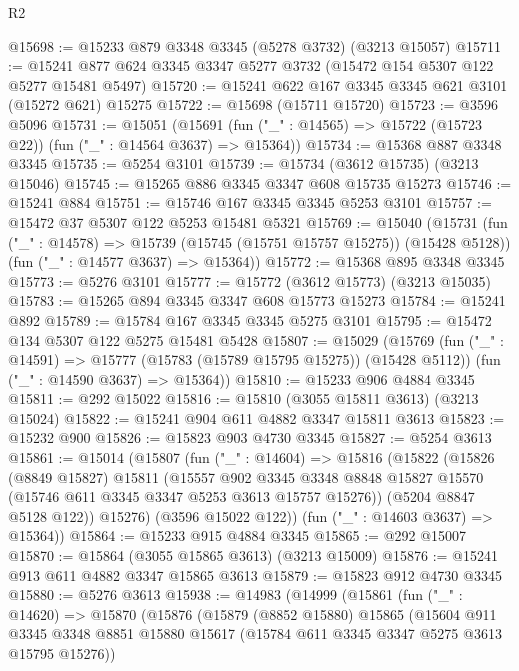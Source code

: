 \begin{lexlean}{R2}
\begin{coremodule}
@15698 := @15233 @879 @3348 @3345 (@5278 @3732) (@3213 @15057)
@15711 := @15241 @877 @624 @3345 @3347 @5277 @3732 (@15472 @154 @5307 @122 @5277 @15481 @5497)
@15720 := @15241 @622 @167 @3345 @3345 @621 @3101 (@15272 @621) @15275
@15722 := @15698 (@15711 @15720)
@15723 := @3596 @5096
@15731 := @15051
    (@15691 (fun ("_" : @14565) => @15722 (@15723 @22)) (fun ("_" : @14564 @3637) => @15364))
@15734 := @15368 @887 @3348 @3345
@15735 := @5254 @3101
@15739 := @15734 (@3612 @15735) (@3213 @15046)
@15745 := @15265 @886 @3345 @3347 @608 @15735 @15273
@15746 := @15241 @884
@15751 := @15746 @167 @3345 @3345 @5253 @3101
@15757 := @15472 @37 @5307 @122 @5253 @15481 @5321
@15769 := @15040
    (@15731
      (fun ("_" : @14578) => @15739 (@15745 (@15751 @15757 @15275)) (@15428 @5128))
      (fun ("_" : @14577 @3637) => @15364))
@15772 := @15368 @895 @3348 @3345
@15773 := @5276 @3101
@15777 := @15772 (@3612 @15773) (@3213 @15035)
@15783 := @15265 @894 @3345 @3347 @608 @15773 @15273
@15784 := @15241 @892
@15789 := @15784 @167 @3345 @3345 @5275 @3101
@15795 := @15472 @134 @5307 @122 @5275 @15481 @5428
@15807 := @15029
    (@15769
      (fun ("_" : @14591) => @15777 (@15783 (@15789 @15795 @15275)) (@15428 @5112))
      (fun ("_" : @14590 @3637) => @15364))
@15810 := @15233 @906 @4884 @3345
@15811 := @292 @15022
@15816 := @15810 (@3055 @15811 @3613) (@3213 @15024)
@15822 := @15241 @904 @611 @4882 @3347 @15811 @3613
@15823 := @15232 @900
@15826 := @15823 @903 @4730 @3345
@15827 := @5254 @3613
@15861 := @15014
    (@15807
      (fun ("_" : @14604) =>
      @15816
        (@15822
          (@15826
            (@8849 @15827)
            @15811
            (@15557
              @902
              @3345
              @3348
              @8848
              @15827
              @15570
              (@15746 @611 @3345 @3347 @5253 @3613 @15757 @15276))
            (@5204 @8847 @5128 @122))
          @15276)
        (@3596 @15022 @122))
      (fun ("_" : @14603 @3637) => @15364))
@15864 := @15233 @915 @4884 @3345
@15865 := @292 @15007
@15870 := @15864 (@3055 @15865 @3613) (@3213 @15009)
@15876 := @15241 @913 @611 @4882 @3347 @15865 @3613
@15879 := @15823 @912 @4730 @3345
@15880 := @5276 @3613
@15938 := @14983
    (@14999
      (@15861
        (fun ("_" : @14620) =>
        @15870
          (@15876
            (@15879
              (@8852 @15880)
              @15865
              (@15604
                @911
                @3345
                @3348
                @8851
                @15880
                @15617
                (@15784 @611 @3345 @3347 @5275 @3613 @15795 @15276))

\end{coremodule}
\end{lexlean}
